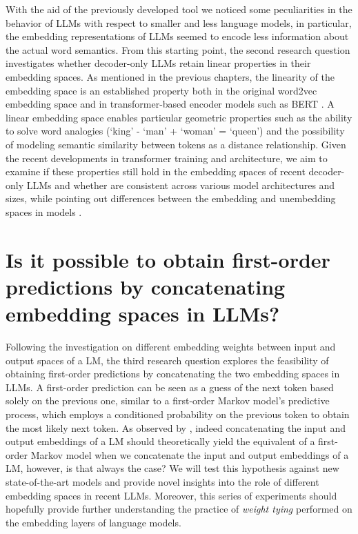 With the aid of the previously developed tool we noticed some peculiarities in the behavior of LLMs with respect to smaller and less  language models, in particular, the embedding representations of LLMs seemed to encode less information about the actual word semantics.
From this starting point, the second research question investigates whether decoder-only LLMs retain linear properties in their embedding spaces.
As mentioned in the previous chapters, the linearity of the embedding space is an established property both in the original word2vec embedding space \cite{mikolov2013} and in transformer-based encoder models such as BERT .
A linear embedding space enables particular geometric properties such as the ability to solve word analogies (`king' - `man' + `woman' = `queen') and the possibility of modeling semantic similarity between tokens as a distance relationship.
Given the recent developments in transformer training and architecture, we aim to examine if these properties still hold in the embedding spaces of recent decoder-only LLMs and whether  are consistent across various model architectures and sizes, while pointing out differences between the embedding and unembedding spaces in models .

\section{Is it possible to obtain first-order predictions by concatenating embedding spaces in LLMs?}

Following the investigation on different embedding weights between input and output spaces of a LM, the third research question explores the feasibility of obtaining first-order predictions by concatenating the two embedding spaces in LLMs.
A first-order prediction can be seen as a guess of the next token based solely on the previous one, similar to a first-order Markov model's predictive process, which employs a conditioned probability on the previous token to obtain the most likely next token.
As observed by , indeed concatenating the input and output embeddings of a LM should theoretically yield the equivalent of a first-order Markov model when we concatenate the input and output embeddings of a LM, however, is that always the case?
We will test this hypothesis against new state-of-the-art models and provide novel insights into the role of different embedding spaces in recent LLMs.
Moreover, this series of experiments should hopefully provide further understanding  the practice of \emph{weight tying}  performed on the embedding layers of language models.